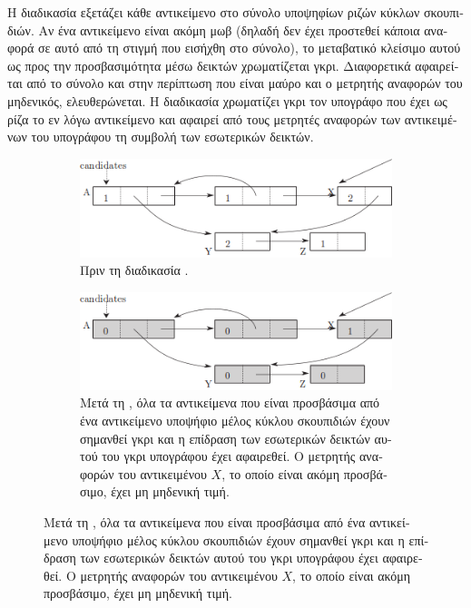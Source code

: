 \begin{greek}
Η διαδικασία \textenglish{} εξετάζει κάθε
αντικείμενο στο σύνολο υποψηφίων ριζών κύκλων σκουπιδιών.
Αν ένα αντικείμενο είναι ακόμη μωβ (δηλαδή δεν έχει προστεθεί
κάποια αναφορά σε αυτό από τη στιγμή που εισήχθη στο σύνολο),
το μεταβατικό κλείσιμο αυτού ως προς την προσβασιμότητα μέσω
δεικτών χρωματίζεται γκρι. Διαφορετικά αφαιρείται από το
σύνολο και στην περίπτωση που είναι μαύρο και ο μετρητής
αναφορών του μηδενικός, ελευθερώνεται. Η διαδικασία
\textenglish{} χρωματίζει γκρι τον υπογράφο που έχει ως
ρίζα το εν λόγω αντικείμενο και αφαιρεί από τους μετρητές
αναφορών των αντικειμένων του υπογράφου τη συμβολή των
εσωτερικών δεικτών.

\begin{figure}
  \centering
  \begin{subfigure}{1.0\textwidth}
    \includegraphics{figures/refcnt_2a}
    \caption{Πριν τη διαδικασία \textenglish{}.}
  \end{subfigure}

  \begin{subfigure}[b]{1.0\textwidth}
    \includegraphics{figures/refcnt_2b}
    \caption
      {Μετά τη \textenglish{}, όλα τα αντικείμενα που
       είναι προσβάσιμα από ένα αντικείμενο υποψήφιο μέλος
       κύκλου σκουπιδιών έχουν σημανθεί γκρι και η επίδραση
       των εσωτερικών δεικτών αυτού του γκρι υπογράφου έχει
       αφαιρεθεί. Ο μετρητής αναφορών του αντικειμένου $X$,
       το οποίο είναι ακόμη προσβάσιμο, έχει μη μηδενική
       τιμή.}
  \end{subfigure}
  

\end{figure}
\end{greek}

